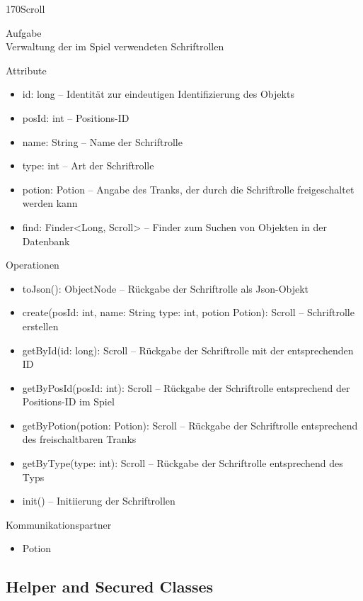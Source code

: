 \newpage
\begin{class}{170}{Scroll}
\item[Aufgabe]~\\
Verwaltung der im Spiel verwendeten Schriftrollen
\item[Attribute]~\\
\begin{itemize}
\item id: long -- Identität zur eindeutigen Identifizierung des Objekts
\item posId: int -- Positions-ID
\item name: String -- Name der Schriftrolle
\item type: int -- Art der Schriftrolle
\item potion: Potion -- Angabe des Tranks, der durch die Schriftrolle freigeschaltet werden kann
\item find: Finder<Long, Scroll> -- Finder zum Suchen von Objekten in der Datenbank
\end{itemize}
\item[Operationen]~\\
\begin{itemize}
\item toJson(): ObjectNode -- Rückgabe der Schriftrolle als Json-Objekt
\item create(posId: int, name: String
   type: int, potion Potion): Scroll -- Schriftrolle erstellen
\item getById(id: long): Scroll -- Rückgabe der Schriftrolle mit der entsprechenden ID
\item getByPosId(posId: int): Scroll -- Rückgabe der Schriftrolle entsprechend der Positions-ID im Spiel
\item getByPotion(potion: Potion): Scroll -- Rückgabe der Schriftrolle entsprechend des freischaltbaren Tranks
\item getByType(type: int): Scroll -- Rückgabe der Schriftrolle entsprechend des Typs
\item init() -- Initiierung der Schriftrollen
\end{itemize}
\item[Kommunikationspartner]~\\
\begin{itemize}
\item Potion
\end{itemize}
\end{class}

\newpage
\subsection{Helper and Secured Classes}

